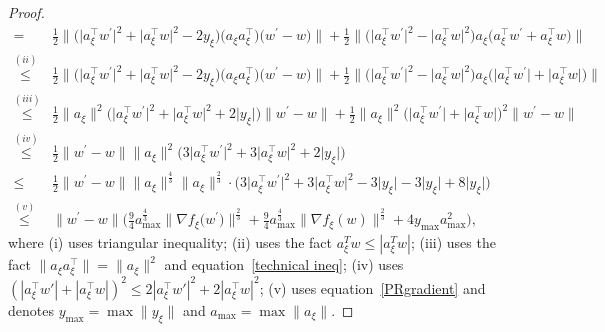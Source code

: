 \documentclass[10pt]{article} %
\def\eqref#1{equation~\ref{#1}}
\newtheorem{proof}{Proof}
\begin{document}
\begin{proof}
\begin{align}
=& \frac{1}{2}\big\|\big(\big|a_{\xi}^{\top} w^{\prime}\big|^2+\big|a_{\xi}^{\top} w\big|^2-2 y_{\xi}\big)\big(a_{\xi} a_{\xi}^{\top}\big)\big(w^{\prime}-w\big) \big \|
+\frac{1}{2}\big \|\big(\big|a_{\xi}^{\top} w^{\prime}\big|^2-\big|a_{\xi}^{\top} w\big|^2\big)a_{\xi}\big(a_{\xi}^{\top}w^{\prime}+a_{\xi}^{\top}w\big)\big\| \nonumber \\
\overset{(ii)}{\leq}&  \frac{1}{2}\big\|\big(\big|a_{\xi}^{\top} w^{\prime}\big|^2+\big|a_{\xi}^{\top} w\big|^2-2 y_{\xi}\big)\big(a_{\xi} a_{\xi}^{\top}\big)\big(w^{\prime}-w\big) \big \|
+\frac{1}{2}\big \|\big(\big|a_{\xi}^{\top} w^{\prime}\big|^2-\big|a_{\xi}^{\top} w\big|^2\big)a_{\xi}\big(\big|a_{\xi}^{\top}w^{\prime}\big|+\big| a_{\xi}^{\top}w\big|\big)\big\| \nonumber \\
\overset{(iii)}{\leq}& \frac{1}{2}\big\|a_{\xi}\big\|^2\big(\big|a_{\xi}^{\top} w^{\prime}\big|^2+\big|a_{\xi}^{\top} w\big|^2+2\big|y_{\xi}\big|\big)\big\|w^{\prime}-w\big\| +\frac{1}{2}\big\|a_{\xi}\big\|^2\big(\big|a_{\xi}^{\top} w^{\prime}\big|+\big|a_{\xi}^{\top} w\big|\big)^2\big\|w^{\prime}-w\big\| \nonumber \\
\overset{(iv)}{\leq}& \frac{1}{2}\big\|w^{\prime}-w\big\|\big\|a_{\xi}\big\|^2\big(3\big|a_{\xi}^{\top} w^{\prime}\big|^2+3\big|a_{\xi}^{\top} w\big|^2+2\big|y_{\xi}\big|\big) \nonumber\\
\leq& \frac{1}{2}\big\|w^{\prime}-w\big\|\big\|a_{\xi}\big\|^{\frac{4}{3}}\big\|a_{\xi}\big\|^{\frac{2}{3}}\cdot\big(3\big|a_{\xi}^{\top} w^{\prime}\big|^2+3\big|a_{\xi}^{\top} w\big|^2-3\big|y_{\xi}\big|-3\big|y_{\xi}\big|+8\big|y_{\xi}\big|\big)\nonumber\\
\overset{(v)}{\leq}&\big\|w^{\prime}-w\big\|\big(\frac{9}{4} a_{\max }^{\frac{4}{3}}\big\|\nabla f_{\xi}\big(w^{\prime}\big)\big\|^{\frac{2}{3}}+\frac{9}{4} a_{\max }^{\frac{4}{3}}\big\|\nabla f_{\xi}(w)\big\|^{\frac{2}{3}}+4 y_{\max } a_{\max }^2\big),
\end{align}
where (i) uses triangular inequality; (ii) uses the fact $a_{\xi}^Tw \leq | a_{\xi}^Tw|$; (iii) uses the fact $\|a_{\xi}a_{\xi}^{\top}\|=\|a_{\xi} \|^2$ and  \eqref{technical ineq}; (iv) uses $(|a_{\xi}^{\top}w'|+|a_{\xi}^{\top}w|)^2\leq 2|a_{\xi}^{\top}w'|^2+2|a_{\xi}^{\top}w|^2$; (v) uses \eqref{PRgradient} and denotes $y_{\max }=\max\|y_{\xi}\|$ and $a_{\max }=\max\big\|a_{\xi}\big\|$. 


\end{proof}
\end{document}
